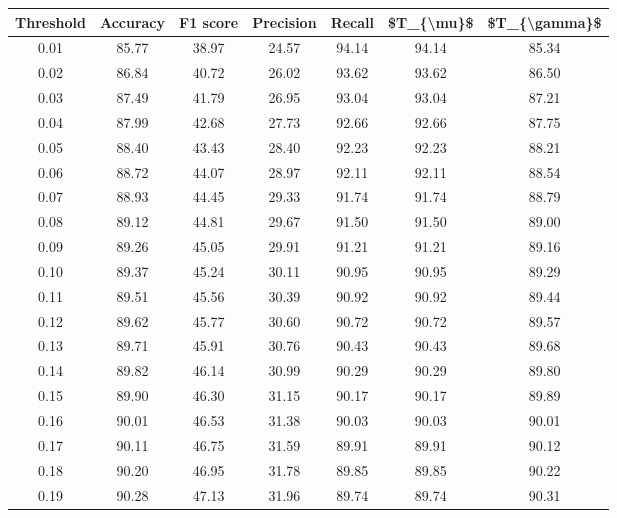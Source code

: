 \begin{tabular}{|c|c|c|c|c|c|c|}
\hline
 Threshold &  Accuracy &  F1 score &  Precision &  Recall &  \$T\_\{\textbackslash mu\}\$ &  \$T\_\{\textbackslash gamma\}\$ \\
\hline
      0.01 &     85.77 &     38.97 &      24.57 &   94.14 &      94.14 &         85.34 \\
      0.02 &     86.84 &     40.72 &      26.02 &   93.62 &      93.62 &         86.50 \\
      0.03 &     87.49 &     41.79 &      26.95 &   93.04 &      93.04 &         87.21 \\
      0.04 &     87.99 &     42.68 &      27.73 &   92.66 &      92.66 &         87.75 \\
      0.05 &     88.40 &     43.43 &      28.40 &   92.23 &      92.23 &         88.21 \\
      0.06 &     88.72 &     44.07 &      28.97 &   92.11 &      92.11 &         88.54 \\
      0.07 &     88.93 &     44.45 &      29.33 &   91.74 &      91.74 &         88.79 \\
      0.08 &     89.12 &     44.81 &      29.67 &   91.50 &      91.50 &         89.00 \\
      0.09 &     89.26 &     45.05 &      29.91 &   91.21 &      91.21 &         89.16 \\
      0.10 &     89.37 &     45.24 &      30.11 &   90.95 &      90.95 &         89.29 \\
      0.11 &     89.51 &     45.56 &      30.39 &   90.92 &      90.92 &         89.44 \\
      0.12 &     89.62 &     45.77 &      30.60 &   90.72 &      90.72 &         89.57 \\
      0.13 &     89.71 &     45.91 &      30.76 &   90.43 &      90.43 &         89.68 \\
      0.14 &     89.82 &     46.14 &      30.99 &   90.29 &      90.29 &         89.80 \\
      0.15 &     89.90 &     46.30 &      31.15 &   90.17 &      90.17 &         89.89 \\
      0.16 &     90.01 &     46.53 &      31.38 &   90.03 &      90.03 &         90.01 \\
      0.17 &     90.11 &     46.75 &      31.59 &   89.91 &      89.91 &         90.12 \\
      0.18 &     90.20 &     46.95 &      31.78 &   89.85 &      89.85 &         90.22 \\
      0.19 &     90.28 &     47.13 &      31.96 &   89.74 &      89.74 &         90.31 \\

\end{tabular}
